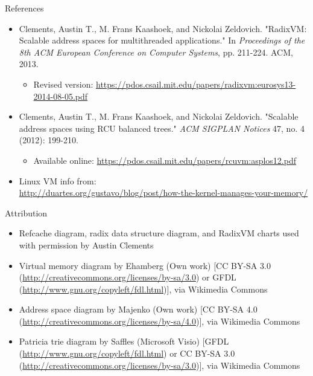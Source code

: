 \documentclass[aspectratio=169]{beamer}
\newcommand{\bi}{\begin{itemize}}
\newcommand{\ei}{\end{itemize}}
\begin{document}

\begin{frame}[noframenumbering]{References}
  \bi
\item Clements, Austin T., M. Frans Kaashoek, and Nickolai Zeldovich. "RadixVM: Scalable address spaces for multithreaded applications." In \emph{Proceedings of the 8th ACM European Conference on Computer Systems}, pp. 211-224. ACM, 2013.
  \bi
\item Revised version: \url{https://pdos.csail.mit.edu/papers/radixvm:eurosys13-2014-08-05.pdf}
  \ei
\item Clements, Austin T., M. Frans Kaashoek, and Nickolai Zeldovich. "Scalable address spaces using RCU balanced trees." \emph{ACM SIGPLAN Notices} 47, no. 4 (2012): 199-210.
  \bi
\item Available online: \url{https://pdos.csail.mit.edu/papers/rcuvm:asplos12.pdf}
  \ei
\item Linux VM info from:\\ \url{http://duartes.org/gustavo/blog/post/how-the-kernel-manages-your-memory/}
  \ei
\end{frame}

\begin{frame}[noframenumbering]{Attribution}
  \bi
\item Refcache diagram, radix data structure diagram, and RadixVM charts used with permission by Austin Clements
\item Virtual memory diagram by Ehamberg (Own work) [CC BY-SA 3.0 (\url{http://creativecommons.org/licenses/by-sa/3.0}) or GFDL (\url{http://www.gnu.org/copyleft/fdl.html})], via Wikimedia Commons
\item Address space diagram by Majenko (Own work) [CC BY-SA 4.0 (\url{http://creativecommons.org/licenses/by-sa/4.0})], via Wikimedia Commons
\item Patricia trie diagram by Saffles (Microsoft Visio) [GFDL (\url{http://www.gnu.org/copyleft/fdl.html}) or CC BY-SA 3.0 (\url{http://creativecommons.org/licenses/by-sa/3.0})], via Wikimedia Commons
  \ei
\end{frame}
\end{document}
